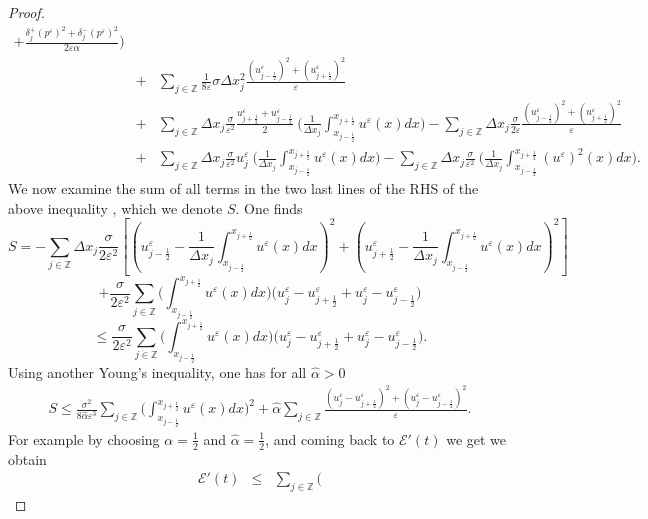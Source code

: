 \documentclass[a4paper,french,english,10pt]{article}
\newcommand\eps{\varepsilon}
\begin{document}
\begin{proof}
\begin{eqnarray*}
+\frac{\delta_{j}^+(p^{\eps})^2+\delta_{j}^-(p^{\eps}
)^2}{2\eps\alpha} \bigg) \\
&+& \sum_{j\in \mathbb{Z}} \frac{1}{8\eps} \sigma \Delta x_j^2
\frac{(u_{j-\frac12 }^{\eps})^2+ (u_{j+\frac12 }^{\eps})^2}{\eps}\\
&+& \sum_{j\in \mathbb{Z}} \Delta x_j  \frac{\sigma}{\eps^2}
\frac{u_{j+\frac12 }^{\eps}+u_{j-\frac12 }^{\eps}}{2}\: \bigg(
\frac{1}{\Delta x_j} {\int_{x_{j-\frac12}}^{x_{j+\frac12}}}
 u^{\eps}(x) dx \bigg) 
-\sum_{j\in \mathbb{Z}} \Delta x_j \frac{\sigma}{2\eps}
\frac{(u_{j-\frac12 }^{\eps})^2+(u_{j+\frac12 }^{\eps})^2}{\eps} \\
&+& \sum_{j\in \mathbb{Z}} \Delta x_j  \frac{\sigma}{\eps^2} u^{\eps}_j \:
\bigg( \frac{1}{\Delta x_j} {\int_{x_{j-\frac12}}^{x_{j+\frac12}}} u^{\eps}(x) dx \bigg) -
\sum_{j\in \mathbb{Z}} \Delta x_j \frac{ \sigma  }{\eps^2} \: \bigg(
\frac{1}{\Delta x_j} {\int_{x_{j-\frac12}}^{x_{j+\frac12}}} (u^{\eps})^2(x) dx \bigg).
\end{eqnarray*} 
We now examine
 the sum of all terms in the two last lines of the RHS of the above inequality , which we denote $S$. 
One finds
$$
S
=-
\sum_{j\in \mathbb{Z}} \Delta x_j \frac{\sigma}{2\eps^2}
\left[
{
\left(u_{j-\frac12 }^{\eps}-\frac{1}{\Delta x_j}
{\int_{x_{j-\frac12}}^{x_{j+\frac12}}} u^{\eps}(x) dx\right)^2+
\left(u_{j+\frac12 }^{\eps}
-\frac{1}{\Delta x_j} {\int_{x_{j-\frac12}}^{x_{j+\frac12}}} u^{\eps}(x) dx
\right)^2}\right]
$$
$$
+\frac{\sigma}{2\eps^2} \sum_{j\in \mathbb{Z}}\bigg( 
{\int_{x_{j-\frac12}}^{x_{j+\frac12}}} u^{\eps}(x) dx \bigg)\bigg( u_j^{\eps}-u_{j+\frac12 }^{\eps} +
u_j^{\eps}-u_{j-\frac12 }^{\eps}\bigg)
$$
$$ \leq \frac{\sigma}{2\eps^2} \sum_{j\in \mathbb{Z}}\bigg( 
{\int_{x_{j-\frac12}}^{x_{j+\frac12}}} u^{\eps}(x) dx \bigg)\bigg( u_j^{\eps}-u_{j+\frac12 }^{\eps} +
u_j^{\eps}-u_{j-\frac12 }^{\eps}\bigg).
$$
Using another Young's inequality, one has for all $\widehat{\alpha}>0$
\begin{eqnarray*}
S \leq \frac{\sigma^2}{8\widehat{\alpha}\eps^3} \sum_{j\in \mathbb{Z}}\bigg(
{\int_{x_{j-\frac12}}^{x_{j+\frac12}}} u^{\eps}(x) dx \bigg)^2+ \widehat{\alpha} \sum_{j\in
\mathbb{Z}} \frac{(u^{\eps}_j-u_{j+\frac12 }^{\eps})^2 +
(u^{\eps}_j-u_{j-\frac12 }^{\eps})^2}{\eps} .
\end{eqnarray*}
For example by choosing $\alpha=\frac12$ and $\widehat{\alpha}=\frac12$, and coming back to $\mathscr{E}'(t) $ we get
we obtain
\begin{eqnarray} \label{eq:eqn1}
\mathscr{E}'(t)  & \leq & \sum_{j\in \mathbb{Z}} \bigg(

\end{eqnarray}
\end{proof}
\end{document}
